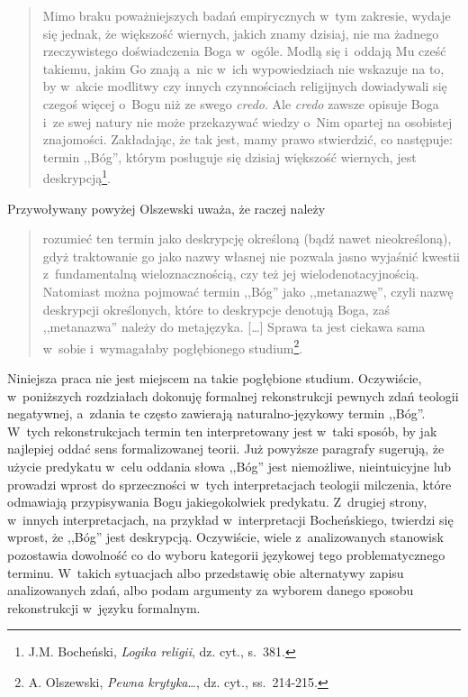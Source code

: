 \begin{quote}
Mimo braku poważniejszych badań empirycznych w~tym zakresie, wydaje się jednak, że większość wiernych, jakich znamy dzisiaj, nie ma żadnego rzeczywistego doświadczenia Boga w~ogóle. Modlą się i~oddają Mu cześć takiemu, jakim Go znają a~nic w~ich wypowiedziach nie wskazuje na to, by w~akcie modlitwy czy innych czynnościach religijnych dowiadywali się czegoś więcej o~Bogu niż ze swego \textit{credo}. Ale \textit{credo} zawsze opisuje Boga i~ze swej natury nie może przekazywać wiedzy o~Nim opartej na osobistej znajomości. Zakładając, że tak jest, mamy prawo stwierdzić, co następuje: termin ,,Bóg'', którym posługuje się dzisiaj większość wiernych, jest deskrypcją\footnote{J.M. Bocheński, \textit{Logika religii}, dz. cyt., s.~381.}.
\end{quote}
Przywoływany powyżej Olszewski uważa, że raczej należy

\begin{quote}
rozumieć ten termin jako deskrypcję określoną (bądź nawet nieokreśloną), gdyż traktowanie go jako nazwy własnej nie pozwala jasno wyjaśnić kwestii z~fundamentalną wieloznacznością, czy też jej wielodenotacyjnością. Natomiast można pojmować termin ,,Bóg'' jako ,,metanazwę'', czyli nazwę deskrypcji określonych, które to deskrypcje denotują Boga, zaś ,,metanazwa'' należy do metajęzyka. [\ldots] Sprawa ta jest ciekawa sama w~sobie i~wymagałaby pogłębionego studium\footnote{A. Olszewski, \textit{Pewna krytyka}\ldots, dz. cyt., ss.~214-215.}.
\end{quote}

Niniejsza praca nie jest miejscem na takie pogłębione studium. Oczywiście, w~poniższych rozdziałach dokonuję formalnej rekonstrukcji pewnych zdań teologii negatywnej, a~zdania te często zawierają naturalno-językowy termin ,,Bóg''. W~tych rekonstrukcjach termin ten interpretowany jest w~taki sposób, by jak najlepiej oddać sens formalizowanej teorii. Już powyższe paragrafy sugerują, że użycie predykatu w~celu oddania słowa ,,Bóg'' jest niemożliwe, nieintuicyjne lub prowadzi wprost do sprzeczności w~tych interpretacjach teologii milczenia, które odmawiają przypisywania Bogu jakiegokolwiek predykatu. Z~drugiej strony, w~innych interpretacjach, na przykład w~interpretacji Bocheńskiego, twierdzi się wprost, że ,,Bóg'' jest deskrypcją. Oczywiście, wiele z~analizowanych stanowisk pozostawia dowolność co do wyboru kategorii językowej tego problematycznego terminu. W~takich sytuacjach albo przedstawię obie alternatywy zapisu analizowanych zdań, albo podam argumenty za wyborem danego sposobu rekonstrukcji w~języku formalnym.


